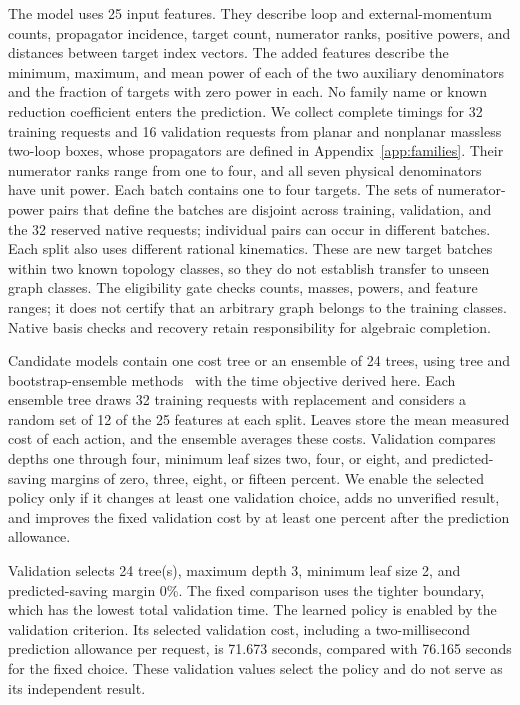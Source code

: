 The model uses 25 input features. They describe loop and external-momentum counts, propagator incidence, target count, numerator ranks, positive powers, and distances between target index vectors. The added features describe the minimum, maximum, and mean power of each of the two auxiliary denominators and the fraction of targets with zero power in each. No family name or known reduction coefficient enters the prediction. We collect complete timings for 32 training requests and 16 validation requests from planar and nonplanar massless two-loop boxes, whose propagators are defined in Appendix~\ref{app:families}. Their numerator ranks range from one to four, and all seven physical denominators have unit power. Each batch contains one to four targets. The sets of numerator-power pairs that define the batches are disjoint across training, validation, and the 32 reserved native requests; individual pairs can occur in different batches. Each split also uses different rational kinematics. These are new target batches within two known topology classes, so they do not establish transfer to unseen graph classes. The eligibility gate checks counts, masses, powers, and feature ranges; it does not certify that an arbitrary graph belongs to the training classes. Native basis checks and recovery retain responsibility for algebraic completion.

Candidate models contain one cost tree or an ensemble of 24 trees, using tree and bootstrap-ensemble methods~\cite{CART1984,Breiman2001Forest} with the time objective derived here. Each ensemble tree draws 32 training requests with replacement and considers a random set of 12 of the 25 features at each split. Leaves store the mean measured cost of each action, and the ensemble averages these costs. Validation compares depths one through four, minimum leaf sizes two, four, or eight, and predicted-saving margins of zero, three, eight, or fifteen percent. We enable the selected policy only if it changes at least one validation choice, adds no unverified result, and improves the fixed validation cost by at least one percent after the prediction allowance.

Validation selects 24 tree(s), maximum depth 3, minimum leaf size 2, and predicted-saving margin 0\%. The fixed comparison uses the tighter boundary, which has the lowest total validation time. The learned policy is enabled by the validation criterion. Its selected validation cost, including a two-millisecond prediction allowance per request, is 71.673 seconds, compared with 76.165 seconds for the fixed choice. These validation values select the policy and do not serve as its independent result.

